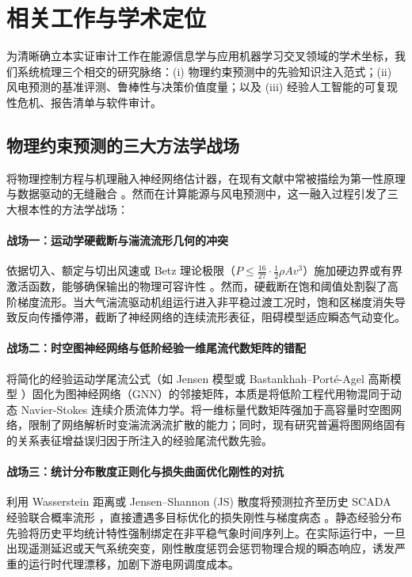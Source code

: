 \section{相关工作与学术定位}
\label{sec:related_work}

为清晰确立本实证审计工作在能源信息学与应用机器学习交叉领域的学术坐标，我们系统梳理三个相交的研究脉络：(i) 物理约束预测中的先验知识注入范式；(ii) 风电预测的基准评测、鲁棒性与决策价值度量；以及 (iii) 经验人工智能的可复现性危机、报告清单与软件审计。

\subsection{物理约束预测的三大方法学战场}
将物理控制方程与机理融入神经网络估计器，在现有文献中常被描绘为第一性原理与数据驱动的无缝融合 \cite{karniadakis2021physics,raissi2019physics}。然而在计算能源与风电预测中，这一融入过程引发了三大根本性的方法学战场：

\paragraph{战场一：运动学硬截断与湍流流形几何的冲突} 依据切入、额定与切出风速或 Betz 理论极限（$P \le \frac{16}{27} \cdot \frac{1}{2} \rho A v^3$）施加硬边界或有界激活函数，能够确保输出的物理可容许性 \cite{tgdpf2025}。然而，硬截断在饱和阈值处割裂了高阶梯度流形。当大气湍流驱动机组运行进入非平稳过渡工况时，饱和区梯度消失导致反向传播停滞，截断了神经网络的连续流形表征，阻碍模型适应瞬态气动变化。

\paragraph{战场二：时空图神经网络与低阶经验一维尾流代数矩阵的错配} 将简化的经验运动学尾流公式（如 Jensen 模型或 Bastankhah--Port\'{e}-Agel 高斯模型 \cite{jensen1983note,bastankhah2014new,s34_prx2023}）固化为图神经网络（GNN）的邻接矩阵，本质是将低阶工程代用物混同于动态 Navier-Stokes 连续介质流体力学。将一维标量代数矩阵强加于高容量时空图网络，限制了网络解析时变湍流涡流扩散的能力；同时，现有研究普遍将图网络固有的关系表征增益误归因于所注入的经验尾流代数先验。

\paragraph{战场三：统计分布散度正则化与损失曲面优化刚性的对抗} 利用 Wasserstein 距离或 Jensen--Shannon (JS) 散度将预测拉齐至历史 SCADA 经验联合概率流形 \cite{pct2026,tgdpf2025}，直接遭遇多目标优化的损失刚性与梯度病态 \cite{krishnapriyan2021}。静态经验分布先验将历史平均统计特性强制绑定在非平稳气象时间序列上。在实际运行中，一旦出现遥测延迟或天气系统突变，刚性散度惩罚会惩罚物理合规的瞬态响应，诱发严重的运行时代理漂移，加剧下游电网调度成本。

